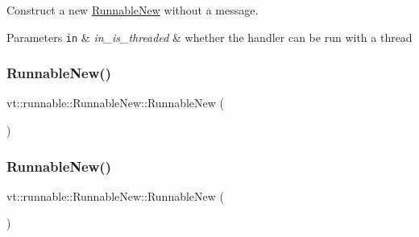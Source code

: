 Construct a new {\ttfamily \hyperlink{structvt_1_1runnable_1_1_runnable_new}{Runnable\+New}} without a message. 


\begin{DoxyParams}[1]{Parameters}
\mbox{\tt in}  & {\em in\+\_\+is\+\_\+threaded} & whether the handler can be run with a thread \\
\hline
\end{DoxyParams}
\mbox{\label{structvt_1_1runnable_1_1_runnable_new_ac7e1d836710c2d0cd2791f1a1c5ac03c}} 
\subsubsection{\texorpdfstring{Runnable\+New()}{RunnableNew()}\hspace{0.1cm}{\footnotesize\ttfamily [3/4]}}
{\footnotesize\ttfamily vt\+::runnable\+::\+Runnable\+New\+::\+Runnable\+New (\begin{DoxyParamCaption}\item[{\hyperlink{structvt_1_1runnable_1_1_runnable_new}{Runnable\+New} \&\&}]{ }\end{DoxyParamCaption})\hspace{0.3cm}{\ttfamily [default]}}

\mbox{\label{structvt_1_1runnable_1_1_runnable_new_a4c34cf076ffd914c3d18aca7d2ff28db}} 
\subsubsection{\texorpdfstring{Runnable\+New()}{RunnableNew()}\hspace{0.1cm}{\footnotesize\ttfamily [4/4]}}
{\footnotesize\ttfamily vt\+::runnable\+::\+Runnable\+New\+::\+Runnable\+New (\begin{DoxyParamCaption}\item[{\hyperlink{structvt_1_1runnable_1_1_runnable_new}{Runnable\+New} const \&}]{ }\end{DoxyParamCaption})\hspace{0.3cm}{\ttfamily [delete]}}



